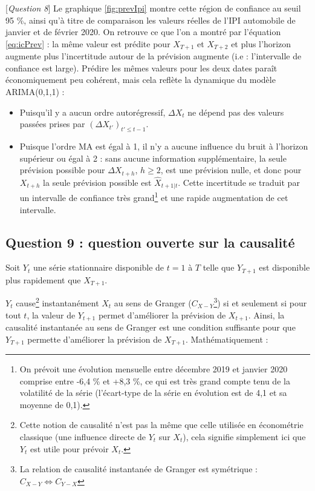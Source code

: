 \documentclass[,french]{article}
\begin{document}
{[}\emph{Question 8}{]} Le graphique \ref{fig:prevIpi} montre cette région de confiance au seuil 95 \%, ainsi qu'à titre de comparaison les valeurs réelles de l'IPI automobile de janvier et de février 2020.
On retrouve ce que l'on a montré par l'équation \eqref{eq:icPrev} : la même valeur est prédite pour \(X_{T+1}\) et \(X_{T+2}\) et plus l'horizon augmente plus l'incertitude autour de la prévision augmente (i.e : l'intervalle de confiance est large).
Prédire les mêmes valeurs pour les deux dates paraît économiquement peu cohérent, mais cela reflète la dynamique du modèle ARIMA(0,1,1) :

\begin{itemize}
\item
  Puisqu'il y a aucun ordre autorégressif, \(\Delta X_t\) ne dépend pas des valeurs passées prises par \((\Delta X_{t'})_{t'\leq t-1}\).
\item
  Puisque l'ordre MA est égal à 1, il n'y a aucune influence du bruit à l'horizon supérieur ou égal à 2 : sans aucune information supplémentaire, la seule prévision possible pour \(\Delta X_{t+h}\), \(h\geq 2\), est une prévision nulle, et donc pour \(X_{t+h}\) la seule prévision possible est \(\widehat X_{t+1\vert t}\).
  Cette incertitude se traduit par un intervalle de confiance très grand\footnote{On prévoit une évolution mensuelle entre décembre 2019 et janvier 2020 comprise entre -6,4 \% et +8,3 \%, ce qui est très grand compte tenu de la volatilité de la série (l'écart-type de la série en évolution est de 4,1 et sa moyenne de 0,1).} et une rapide augmentation de cet intervalle.
\end{itemize}

\hypertarget{question-9-question-ouverte-sur-la-causalituxe9}{%
\subsection{Question 9 : question ouverte sur la causalité}\label{question-9-question-ouverte-sur-la-causalituxe9}}

Soit \(Y_t\) une série stationnaire disponible de \(t = 1\) à \(T\) telle que \(Y_{T+1}\) est disponible plus rapidement que \(X_{T+1}\).

\(Y_t\) cause\footnote{Cette notion de causalité n'est pas la même que celle utilisée en économétrie classique (une influence directe de \(Y_t\) sur \(X_t\)), cela signifie simplement ici que \(Y_t\) est utile pour prévoir \(X_t\).} instantanément \(X_t\) au sens de Granger (\(C_{X - Y}\)\footnote{La relation de causalité instantanée de Granger est symétrique : \(C_{X - Y} \iff C_{Y - X}\)}) si et seulement si pour tout \(t\), la valeur de \(Y_{t+1}\) permet d'améliorer la prévision de \(X_{t+1}\). Ainsi, la causalité instantanée au sens de Granger est une condition suffisante pour que \(Y_{T+1}\) permette d'améliorer la prévision de \(X_{T+1}\). Mathématiquement :
\end{document}
